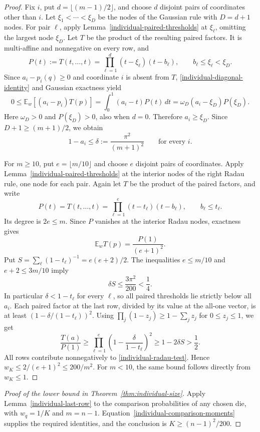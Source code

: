 \begin{proof}
Fix \(i\), put \(d=\lfloor(m-1)/2\rfloor\), and choose \(d\)
disjoint pairs of coordinates other than \(i\).  Let
\(\xi_1<\cdots<\xi_D\) be the nodes of the Gaussian rule with
\(D=d+1\) nodes.  For pair \(\ell\), apply
Lemma~\ref{individual-paired-thresholds} at \(\xi_\ell\), omitting
the largest node \(\xi_D\).  Let \(T\) be the product of the resulting
paired factors.  It is multi-affine and nonnegative on every row, and
\[
  P(t):=T(t,\ldots,t)
  =\prod_{\ell=1}^d(t-\xi_\ell)(t-b_\ell),
  \qquad b_\ell\leq\xi_\ell<\xi_D.
\]
Since \(a_i-p_i(q)\geq0\) and coordinate \(i\) is absent from \(T\),
\eqref{individual-diagonal-identity} and Gaussian exactness yield
\[
  0\leq\mathbb E_w[(a_i-p_i)T(p)]
  =\int_0^1(a_i-t)P(t)\,dt
  =\omega_D(a_i-\xi_D)P(\xi_D).
\]
Here \(\omega_D>0\) and \(P(\xi_D)>0\), also when \(d=0\).
Therefore \(a_i\geq\xi_D\).  Since \(D+1\geq(m+1)/2\), we obtain
\[
  1-a_i\leq\delta:=\frac{\pi^2}{(m+1)^2}
  \qquad\text{for every }i.
\]

For \(m\geq10\), put \(e=\lfloor m/10\rfloor\) and choose \(e\)
disjoint pairs of coordinates.  Apply
Lemma~\ref{individual-paired-thresholds} at the interior nodes of the
right Radau rule, one node for each pair.  Again let \(T\) be the
product of the paired factors, and write
\[
  P(t)=T(t,\ldots,t)
  =\prod_{\ell=1}^e(t-t_\ell)(t-b_\ell),\qquad b_\ell\leq t_\ell.
\]
Its degree is \(2e\leq m\).  Since \(P\) vanishes at the interior
Radau nodes, exactness gives
\begin{equation}\label{individual-radau-test}
  \mathbb E_w T(p)=\frac{P(1)}{(e+1)^2}.
\end{equation}
Put \(S=\sum_\ell(1-t_\ell)^{-1}=e(e+2)/2\).  The inequalities
\(e\leq m/10\) and \(e+2\leq3m/10\) imply
\[
  \delta S\leq\frac{3\pi^2}{200}<\frac14.
\]
In particular \(\delta<1-t_\ell\) for every \(\ell\), so all paired
thresholds lie strictly below all \(a_i\).  Each paired factor at the
last row, divided by its value at the all-one vector, is at least
\((1-\delta/(1-t_\ell))^2\).  Using
\(\prod_j(1-z_j)\geq1-\sum_jz_j\) for \(0\leq z_j\leq1\), we get
\[
  \frac{T(a)}{P(1)}
  \geq\prod_{\ell=1}^e
       \left(1-\frac{\delta}{1-t_\ell}\right)^2
  \geq1-2\delta S>\frac12.
\]
All rows contribute nonnegatively to
\eqref{individual-radau-test}.  Hence
\(w_K\leq2/(e+1)^2\leq200/m^2\).  For \(m<10\), the same bound
follows directly from \(w_K\leq1\).
\end{proof}

\begin{proof}[Proof of the lower bound in Theorem~\ref{thm:individual-size}]
Apply Lemma~\ref{individual-last-row} to the comparison probabilities
of any chosen die, with \(w_q=1/K\) and \(m=n-1\).
Equation~\eqref{individual-comparison-moments} supplies the required
identities, and the conclusion is \(K\geq(n-1)^2/200\).
\end{proof}

